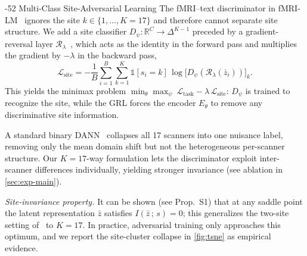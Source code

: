 \documentclass[runningheads]{llncs}
\makeatletter
\renewcommand\subsection{\@startsection{subsection}{2}{\z@}%
  {-5\p@ \@plus -1\p@ \@minus -1\p@}{2\p@ \@plus 1\p@ \@minus 1\p@}%
  {\normalfont\normalsize\bfseries\boldmath}}
\newcommand{\Lgrl}{\mathcal{L}_{\mathrm{site}}}
\makeatother
\begin{document}
\subsection{Multi-Class Site-Adversarial Learning}
\label{sec:method-grl}
The fMRI--text discriminator in fMRI-LM~\cite{wei2026fmrilm} ignores the site $k\in\{1,\dots,K{=}17\}$ and therefore cannot separate site structure. We add a site classifier $D_\psi:\mathbb{R}^C\!\to\!\Delta^{K-1}$ preceded by a gradient-reversal layer $\mathcal{R}_\lambda$~\cite{ganin2016dann}, which acts as the identity in the forward pass and multiplies the gradient by $-\lambda$ in the backward pass,
\begin{equation}
\Lgrl = -\frac{1}{B}\sum_{i=1}^{B}\sum_{k=1}^{K}
\mathbb{1}[s_i{=}k]\,\log\big[D_\psi(\mathcal{R}_\lambda(\bar z_i))\big]_k .
\label{eq:site}
\end{equation}
This yields the minimax problem $\min_{\theta}\max_{\psi}\ \mathcal{L}_{\mathrm{task}}-\lambda\,\Lgrl$: $D_\psi$ is trained to recognize the site, while the GRL forces the encoder $E_\theta$ to remove any discriminative site information.

A standard binary DANN~\cite{ganin2016dann} collapses all 17 scanners into one nuisance label, removing only the mean domain shift but not the heterogeneous per-scanner structure. Our $K{=}17$-way formulation lets the discriminator exploit inter-scanner differences individually, yielding stronger invariance (see ablation in \cref{sec:exp-main}).

\emph{Site-invariance property.} It can be shown (see Prop.~S1) that at any saddle point the latent representation $\bar z$ satisfies $I(\bar z\,;\,s)=0$; this generalizes the two-site setting of~\cite{ganin2016dann} to $K{=}17$. In practice, adversarial training only approaches this optimum, and we report the site-cluster collapse in \cref{fig:tsne} as empirical evidence.
\end{document}
